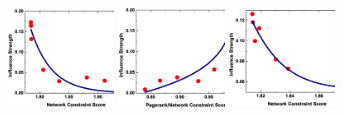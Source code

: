 \documentclass[runningheads,a4paper]{llncs}
\begin{document}
\begin{figure}[htp]
\centering
{}
\hspace{5mm}
 {\includegraphics[width=0.25\textwidth,height=1.5in]{weibo_CS.eps}
\label{fig:3b}}
\hspace{5mm}
{\includegraphics[width=0.25\textwidth,height=1.5in]{weibo_PRCS.eps}
\label{fig:3b}}
\centering
{}
\hspace{5mm}
{\includegraphics[width=0.25\textwidth,height=1.5in]{citation_CS.eps}
}
\end{figure}
\end{document}
